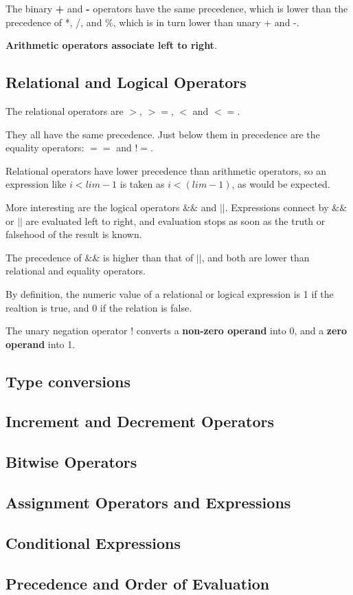 \documentclass{article}
\begin{document}
The binary \textbf{+} and \textbf{-} operators have the same precedence, which is lower than the precedence of *, /, and \%, which is in turn lower than unary + and -.

\textbf{Arithmetic operators associate left to right}.

\clearpage
\subsection{Relational and Logical Operators}

The relational operators are \textbf{$>$}, \textbf{$>=$}, \textbf{$<$} and \textbf{$<=$}.

They all have the same precedence. Just below them in precedence are the equality operators: \textbf{$==$} and \textbf{$!=$}.

Relational operators have lower precedence than arithmetic operators, so an expression like \textbf{$i < lim-1$} is taken as \textbf{$i < (lim-1)$}, as would be expected.

More interesting are the logical operators \textbf{$\&\&$} and \textbf{$||$}. Expressions connect by $\&\&$ or $||$ are evaluated left to right, and evaluation stops as soon as the truth or falsehood of the result is known. 

The precedence of $\&\&$ is higher than that of $||$, and both are lower than relational and equality operators.

By definition, the numeric value of a relational or logical expression is 1 if the realtion is true, and 0 if the relation is false. 

The unary negation operator ! converts a \textbf{non-zero operand} into 0, and a \textbf{zero operand} into 1.

\subsection{Type conversions}

\subsection{Increment and Decrement Operators}

\subsection{Bitwise Operators}

\subsection{Assignment Operators and Expressions}

\subsection{Conditional Expressions}

\subsection{Precedence and Order of Evaluation}
\end{document}
